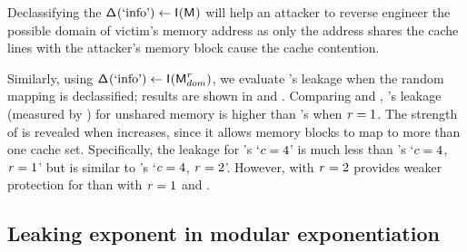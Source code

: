 Declassifying the
$\mathsf{\Delta}_{}(\textrm{`info'})\leftarrow\mathsf{I}_{}(\textsf{M}_{})$ will help an
attacker to reverse engineer the possible domain of victim's memory address as only the
address shares the cache lines with the attacker's memory block cause
the cache contention. 
\fi

Similarly, using $\mathsf{\Delta}_{}(\text{`info'})\leftarrow
\mathsf{I}_{}(\textsf{M}^{\mathit{r}}_{dom})$, we evaluate 's
leakage when the random mapping is declassified; results are shown in
 and
.  Comparing
 and
, 's
leakage (measured by \JaccardWithDeclass{\secretsSetSize}) for
unshared memory is higher than \scatterCache's when $\mathit{r}=1$. The
strength of  is revealed when  increases, since
it allows memory blocks to map to more than one cache set.
Specifically, the leakage for \scatterCache's `$c=4$' is
much less than 's `$c=4$, $\mathit{r}=1$' but
is similar to 's `$c=4$,
$\mathit{r}=2$'. However,  with $\mathit{r}=2$ provides
weaker protection for \flushreload than  with
$\mathit{r}=1$ and \scatterCache.


\subsection{Leaking exponent in modular exponentiation}
\label{dinome:sec:exp:modexp}

